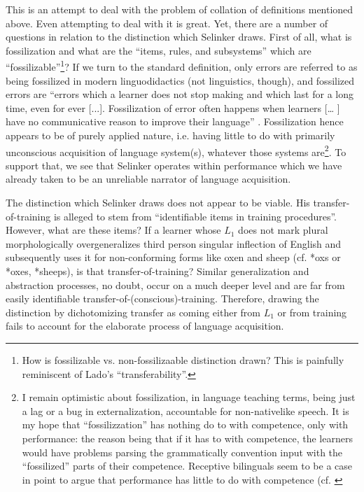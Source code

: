 \documentclass{article}
\begin{document}
This is an attempt to deal with the problem of collation of definitions mentioned above. Even attempting to deal with it is great. Yet, there are a number of questions in relation to the distinction which Selinker draws. First of all, what is fossilization and what are the ``items, rules, and subsystems'' which are ``fossilizable''\footnote{How is fossilizable vs. non-fossilizaable distinction drawn? This is painfully reminiscent of Lado's ``transferability''.}? If we turn to the standard definition, only errors are referred to as being fossilized in modern linguodidactics (not linguistics, though), and fossilized errors are ``errors which a learner does not stop making and which last for a long time, even for ever [...]. Fossilization of error often happens when learners [… ] have no communicative reason to improve their language'' \citep[][p. 63]{spratt_tkt_2011}. Fossilization hence appears to be of purely applied nature, i.e. having little to do with primarily unconscious acquisition of language system(s), whatever those systems are\footnote{I remain optimistic about fossilization, in language teaching terms, being just a lag or a bug in externalization, accountable for non-nativelike speech. It is my hope that ``fossilizzation'' has nothing do to with competence, only with performance: the reason being that if it has to with competence, the learners would have problems parsing the grammatically convention input with the ``fossilized'' parts of their competence. Receptive bilinguals seem to be a case in point to argue that performance has little to do with competence (cf. \citep[][\textit{inter alia}]{sherkina-lieber_grammar_2011, sherkina-lieber_classification_2020}}. To support that, we see that Selinker operates within performance which we have already taken to be an unreliable narrator of language acquisition.

The distinction which Selinker draws does not appear to be viable. His transfer-of-training is alleged to stem from ``identifiable items in training procedures''. However, what are these items? If a learner whose $L_1$ does not mark plural morphologically overgeneralizes third person singular inflection of English and subsequently uses it for non-conforming forms like oxen and sheep (cf. *oxs or *oxes, *sheeps), is that transfer-of-training? Similar generalization and abstraction processes, no doubt, occur on a much deeper level \citep[cf.][pp. 68, 122, 170 fn30, and section 11.2 generally]{lust_child_2006} and are far from easily identifiable transfer-of-(conscious)-training. Therefore, drawing the distinction by dichotomizing transfer as coming either from $L_1$ or from training fails to account for the elaborate process of language acquisition.
\end{document}
